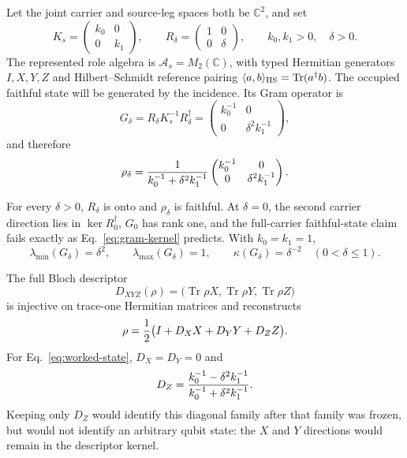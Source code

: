 \documentclass[11pt]{article}
\newcommand{\Tr}{\operatorname{Tr}}
\begin{document}
Let the joint carrier and source-leg spaces both be \(\mathbb C^2\), and set
\begin{equation}
 K_s=\begin{pmatrix}k_0&0\\0&k_1\end{pmatrix},
 \qquad
 R_\delta=\begin{pmatrix}1&0\\0&\delta\end{pmatrix},
 \qquad k_0,k_1>0,\quad\delta>0.
 \label{eq:worked-source-data}
\end{equation}
The represented role algebra is \(\mathcal A_s=M_2(\mathbb C)\), with typed
Hermitian generators \(I,X,Y,Z\) and Hilbert--Schmidt reference pairing
\(\langle a,b\rangle_{\rm HS}=\Tr(a^\dagger b)\).  The occupied faithful
state will be generated by the incidence.  Its Gram operator is
\begin{equation}
 G_\delta=R_\delta K_s^{-1}R_\delta^\dagger
 =\begin{pmatrix}k_0^{-1}&0\\0&\delta^2k_1^{-1}\end{pmatrix},
 \label{eq:worked-gram}
\end{equation}
and therefore
\begin{equation}
 \rho_\delta=
 {1\over k_0^{-1}+\delta^2k_1^{-1}}
 \begin{pmatrix}k_0^{-1}&0\\0&\delta^2k_1^{-1}\end{pmatrix}.
 \label{eq:worked-state}
\end{equation}

For every \(\delta>0\), \(R_\delta\) is onto and \(\rho_\delta\) is faithful.
At \(\delta=0\), the second carrier direction lies in
\(\ker R_0^\dagger\), \(G_0\) has rank one, and the full-carrier faithful-state
claim fails exactly as Eq.~\eqref{eq:gram-kernel} predicts.  With \(k_0=k_1=1\),
\begin{equation}
 \lambda_{\min}(G_\delta)=\delta^2,
 \qquad
 \lambda_{\max}(G_\delta)=1,
 \qquad
 \kappa(G_\delta)=\delta^{-2}
 \quad(0<\delta\le1).
 \label{eq:worked-conditioning}
\end{equation}

The full Bloch descriptor
\begin{equation}
 D_{XYZ}(\rho)=
 \bigl(\Tr\rho X,\Tr\rho Y,\Tr\rho Z\bigr)
 \label{eq:bloch-descriptor}
\end{equation}
is injective on trace-one Hermitian matrices and reconstructs
\begin{equation}
 \rho={1\over2}\bigl(I+D_X X+D_Y Y+D_Z Z\bigr).
 \label{eq:bloch-reconstruction}
\end{equation}
For Eq.~\eqref{eq:worked-state}, \(D_X=D_Y=0\) and
\begin{equation}
 D_Z={k_0^{-1}-\delta^2k_1^{-1}
 \over k_0^{-1}+\delta^2k_1^{-1}}.
 \label{eq:worked-bloch-z}
\end{equation}
Keeping only \(D_Z\) would identify this diagonal family after that family was
frozen, but would not identify an arbitrary qubit state: the \(X\) and \(Y\)
directions would remain in the descriptor kernel.
\end{document}
